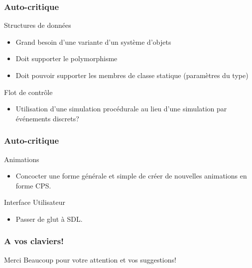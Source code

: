 \documentclass{beamer}
\newcommand{\<}[1]{\`#1}
\begin{document}
\begin{frame}
  \frametitle{Auto-critique}

  \begin{block}{Structures de données}
    \begin{itemize}
    \item Grand besoin d'une variante d'un système d'objets
    \item Doit supporter le polymorphisme
    \item Doit pouvoir supporter les membres de classe statique
      (paramètres du type)
    \end{itemize}
  \end{block}

  \begin{block}{Flot de contrôle}
    \begin{itemize}
    \item Utilisation d'une simulation procédurale au lieu d'une
      simulation par événements discrets?
    \end{itemize}
  \end{block}
\end{frame}

\begin{frame}
  \frametitle{Auto-critique}

  \begin{block}{Animations}
    \begin{itemize}
    \item Concocter une forme générale et simple de créer de nouvelles
      animations en forme CPS.
    \end{itemize}
  \end{block}

  \begin{block}{Interface Utilisateur}
    \begin{itemize}
    \item Passer de glut à SDL.
    \end{itemize}
  \end{block}
\end{frame}

\begin{frame}
  \frametitle{A vos claviers!}

  Merci Beaucoup pour votre attention et vos suggestions!

\end{frame}
\end{document}
